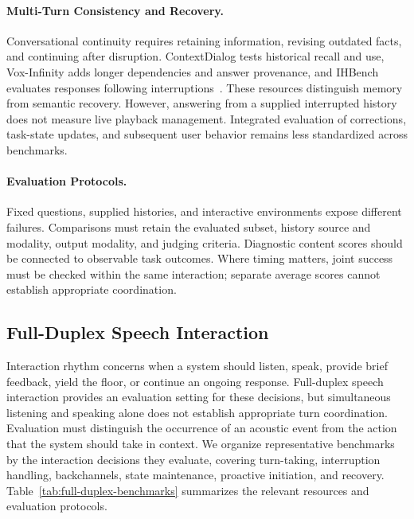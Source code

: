\paragraph{Multi-Turn Consistency and Recovery.}
\label{sec:61halfduplex-consistency-recovery}
Conversational continuity requires retaining information, revising outdated facts, and continuing after disruption. ContextDialog tests historical recall and use, Vox-Infinity adds longer dependencies and answer provenance, and IHBench evaluates responses following interruptions~\citep{61halfduplex-contextdialog,61halfduplex-voxinfinity,61halfduplex-ihbench}. These resources distinguish memory from semantic recovery. However, answering from a supplied interrupted history does not measure live playback management. Integrated evaluation of corrections, task-state updates, and subsequent user behavior remains less standardized across benchmarks.

\paragraph{Evaluation Protocols.}
\label{sec:61halfduplex-protocols}
Fixed questions, supplied histories, and interactive environments expose different failures. Comparisons must retain the evaluated subset, history source and modality, output modality, and judging criteria. Diagnostic content scores should be connected to observable task outcomes. Where timing matters, joint success must be checked within the same interaction; separate average scores cannot establish appropriate coordination.





\subsection{Full-Duplex Speech Interaction}
\label{sec:full-duplex-datasets-and-benchmarks}

Interaction rhythm concerns when a system should listen, speak, provide brief feedback, yield the floor, or continue an ongoing response. Full-duplex speech interaction provides an evaluation setting for these decisions, but simultaneous listening and speaking alone does not establish appropriate turn coordination. Evaluation must distinguish the occurrence of an acoustic event from the action that the system should take in context. We organize representative benchmarks by the interaction decisions they evaluate, covering turn-taking, interruption handling, backchannels, state maintenance, proactive initiation, and recovery. Table~\ref{tab:full-duplex-benchmarks} summarizes the relevant resources and evaluation protocols.

